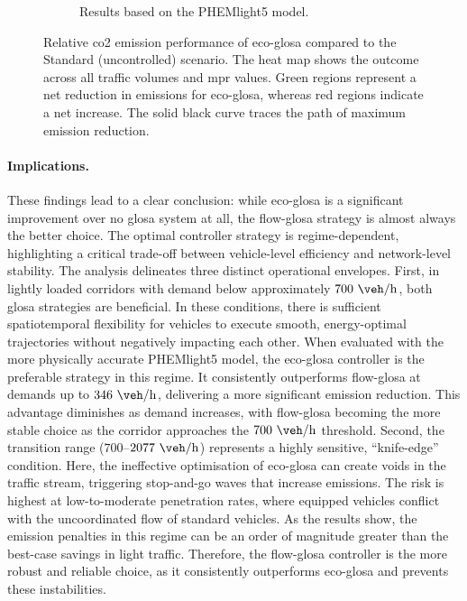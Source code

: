 \begin{figure}[htbp]
\begin{subfigure}[b]{0.65\textwidth}
    \caption{Results based on the PHEMlight5 model.}
    \label{fig:BE_EcoStd_PHEM}
  \end{subfigure}
  \caption[Relative CO2 performance of Eco-GLOSA vs. Standard]{Relative \ac{co2} emission performance of \ac{eco-glosa} compared to the Standard (uncontrolled) scenario. The heat map shows the outcome across all traffic volumes and \ac{mpr} values. Green regions represent a net reduction in emissions for \ac{eco-glosa}, whereas red regions indicate a net increase. The solid black curve traces the path of maximum emission reduction.}
  \label{fig:BE_EcoStd}
\end{figure}

\paragraph{Implications.}
These findings lead to a clear conclusion: while \ac{eco-glosa} is a significant improvement over no \ac{glosa} system at all, the \ac{flow-glosa} strategy is almost always the better choice. The optimal controller strategy is regime-dependent, highlighting a critical trade-off between vehicle-level efficiency and network-level stability. The analysis delineates three distinct operational envelopes.
\mynewline
First, in lightly loaded corridors with demand below approximately $700~\unit{\veh\per\hour}$, both \ac{glosa} strategies are beneficial. In these conditions, there is sufficient spatiotemporal flexibility for vehicles to execute smooth, energy-optimal trajectories without negatively impacting each other. When evaluated with the more physically accurate PHEMlight5 model, the \ac{eco-glosa} controller is the preferable strategy in this regime. It consistently outperforms \ac{flow-glosa} at demands up to $346~\unit{\veh\per\hour}$, delivering a more significant emission reduction. This advantage diminishes as demand increases, with \ac{flow-glosa} becoming the more stable choice as the corridor approaches the $700~\unit{\veh\per\hour}$ threshold.
\mynewline
Second, the transition range ($700$--$2077~\unit{\veh\per\hour}$) represents a highly sensitive, \enquote{knife-edge} condition. Here, the ineffective optimisation of \ac{eco-glosa} can create voids in the traffic stream, triggering stop-and-go waves that increase emissions. The risk is highest at low-to-moderate penetration rates, where equipped vehicles conflict with the uncoordinated flow of standard vehicles. As the results show, the emission penalties in this regime can be an order of magnitude greater than the best-case savings in light traffic. Therefore, the \ac{flow-glosa} controller is the more robust and reliable choice, as it consistently outperforms \ac{eco-glosa} and prevents these instabilities.

